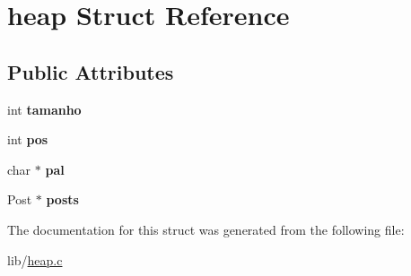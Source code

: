 \hypertarget{structheap}{}\section{heap Struct Reference}
\label{structheap}
\subsection*{Public Attributes}
\begin{DoxyCompactItemize}
\item 
int {\bfseries tamanho}\hypertarget{structheap_a5b2c9d7ad6862b4b98761d3c18bf21de}{}\label{structheap_a5b2c9d7ad6862b4b98761d3c18bf21de}

\item 
int {\bfseries pos}\hypertarget{structheap_a7098a64af665b5f0d18f8c3f718ece90}{}\label{structheap_a7098a64af665b5f0d18f8c3f718ece90}

\item 
char $\ast$ {\bfseries pal}\hypertarget{structheap_a894049ec19e81366f11906dbd6743646}{}\label{structheap_a894049ec19e81366f11906dbd6743646}

\item 
Post $\ast$ {\bfseries posts}\hypertarget{structheap_a06d20d32f9d12beb273fcd412e18006d}{}\label{structheap_a06d20d32f9d12beb273fcd412e18006d}

\end{DoxyCompactItemize}


The documentation for this struct was generated from the following file\+:\begin{DoxyCompactItemize}
\item 
lib/\hyperlink{heap_8c}{heap.\+c}\end{DoxyCompactItemize}
